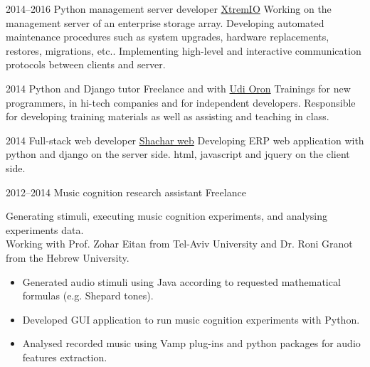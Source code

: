 \documentclass[]{friggeri-cv}  %
\begin{document}
\begin{entrylist}

    \entry
    {2014--2016}
    {Python management server developer}
    {\href{http://xtremio.com/}{XtremIO}}
    {Working on the management server of an enterprise storage array.
     Developing automated maintenance procedures such as system upgrades, hardware replacements, restores, migrations, etc..
     Implementing high-level and interactive communication protocols between clients and server.}

\end{entrylist}
\begin{entrylist}

    \entry
    {2014}
    {Python and Django tutor}
    {Freelance and with \href{http://www.10x.org.il/}{Udi Oron}}
    {Trainings for new programmers, in hi-tech companies and for independent developers. Responsible for developing training materials as well as assisting and teaching in class.}

\end{entrylist}
\begin{entrylist}

    \entry
    {2014}
    {Full-stack web developer}
    {\href{http://www.shachar-web.co.il/}{Shachar web}}
    {Developing ERP web application with python and django on the server side. html, javascript and jquery on the client side.}

\end{entrylist}
\begin{entrylist}

    \entry
    {2012--2014}
    {Music cognition research assistant}
    {Freelance}
    {Generating stimuli, executing music cognition experiments, and analysing experiments data.\\
    Working with Prof. Zohar Eitan from Tel-Aviv University and Dr. Roni Granot from the Hebrew University.
    \begin{itemize}
        \item Generated audio stimuli using Java according to requested mathematical formulas (e.g. Shepard tones).
        \item Developed GUI application to run music cognition experiments with Python.
        \item Analysed recorded music using Vamp plug-ins and python packages for audio features extraction.
    \end{itemize}}

\end{entrylist}
\end{document}
